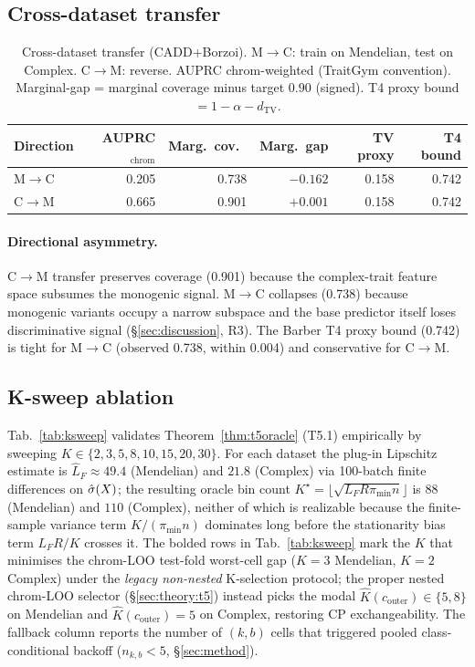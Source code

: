 \subsection{Cross-dataset transfer}
\label{app:tables:crossdataset}

\begin{table}[h]
\centering
\small
\caption{Cross-dataset transfer (CADD+Borzoi). M$\to$C: train on Mendelian, test on Complex. C$\to$M: reverse. AUPRC chrom-weighted (TraitGym convention). Marginal-gap = marginal coverage minus target $0.90$ (signed). T4 proxy bound $= 1 - \alpha - d_{\mathrm{TV}}$.}
\label{tab:crossdataset}
\begin{tabular}{lrrrrr}
\toprule
Direction & AUPRC$_{\mathrm{chrom}}$ & Marg.\ cov.\ & Marg.\ gap & TV proxy & T4 bound \\
\midrule
M$\to$C & 0.205 & 0.738 & $-0.162$ & 0.158 & 0.742 \\
C$\to$M & 0.665 & 0.901 & $+0.001$ & 0.158 & 0.742 \\
\bottomrule
\end{tabular}
\end{table}

\paragraph{Directional asymmetry.}
C$\to$M transfer preserves coverage (0.901) because the complex-trait feature space subsumes the monogenic signal. M$\to$C collapses (0.738) because monogenic variants occupy a narrow subspace and the base predictor itself loses discriminative signal (§\ref{sec:discussion}, R3). The Barber T4 proxy bound (0.742) is tight for M$\to$C (observed 0.738, within 0.004) and conservative for C$\to$M.

\subsection{K-sweep ablation}
\label{app:tables:ksweep}

Tab.~\ref{tab:ksweep} validates Theorem~\ref{thm:t5oracle} (T5.1) empirically by sweeping $K \in \{2, 3, 5, 8, 10, 15, 20, 30\}$. For each dataset the plug-in Lipschitz estimate is $\hat L_F \approx 49.4$ (Mendelian) and $21.8$ (Complex) via 100-batch finite differences on $\hat{\sigma}(X)$; the resulting oracle bin count $K^\star = \lfloor\sqrt{L_F R \pi_{\min} n}\rfloor$ is $88$ (Mendelian) and $110$ (Complex), neither of which is realizable because the finite-sample variance term $K/(\pi_{\min} n)$ dominates long before the stationarity bias term $L_F R / K$ crosses it. The bolded rows in Tab.~\ref{tab:ksweep} mark the $K$ that minimises the chrom-LOO test-fold worst-cell gap ($K = 3$ Mendelian, $K = 2$ Complex) under the \emph{legacy non-nested} K-selection protocol; the proper nested chrom-LOO selector (§\ref{sec:theory:t5}) instead picks the modal $\hat K(c_{\mathrm{outer}}) \in \{5, 8\}$ on Mendelian and $\hat K(c_{\mathrm{outer}}) = 5$ on Complex, restoring CP exchangeability. The fallback column reports the number of $(k,b)$ cells that triggered pooled class-conditional backoff ($n_{k,b} < 5$, §\ref{sec:method}).

